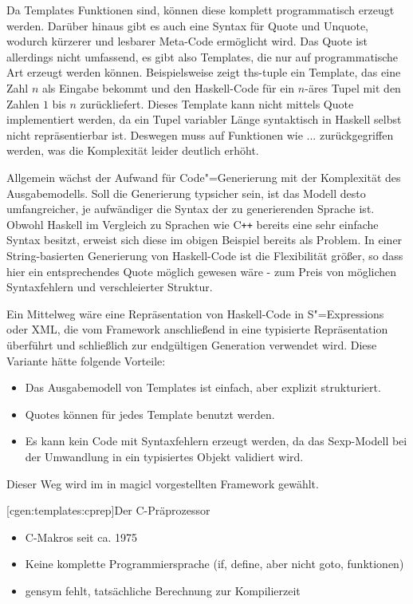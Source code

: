 \documentclass[a4paper, bibgerm]{book}
\newcommand\lsubsection{}
\newcommand\cref{}
\newcommand\abb{}
\newcommand{\sexps}{S"=Expressions}
\newcommand{\cgen}{Code"=Generierung}
\newcommand{\cpp}{C\texttt{++}}
\begin{document}
Da Templates Funktionen sind, können diese komplett programmatisch
erzeugt werden. Darüber hinaus gibt es auch eine Syntax für Quote und
Unquote, wodurch kürzerer und lesbarer Meta-Code ermöglicht wird. Das
Quote ist allerdings nicht umfassend, es gibt also Templates, die nur
auf programmatische Art erzeugt werden können. Beispielsweise zeigt
\abb{ths-tuple} ein Template, das eine Zahl $n$ als Eingabe bekommt und
den Haskell-Code für ein $n$-äres Tupel mit den Zahlen $1$ bis $n$
zurückliefert. Dieses Template kann nicht mittels Quote implementiert
werden, da ein Tupel variabler Länge syntaktisch in Haskell selbst nicht
repräsentierbar ist. Deswegen muss auf Funktionen wie
... zurückgegriffen werden, was die Komplexität leider deutlich
erhöht.

Allgemein wächst der Aufwand für \cgen{} mit der Komplexität des
Ausgabemodells. Soll die Generierung typsicher sein, ist das Modell
desto umfangreicher, je aufwändiger die Syntax der zu generierenden
Sprache ist. Obwohl Haskell im Vergleich zu Sprachen wie \cpp{} bereits
eine sehr einfache Syntax besitzt, erweist sich diese im obigen Beispiel
bereits als Problem. In einer String-basierten Generierung von
Haskell-Code ist die Flexibilität größer, so dass hier ein
entsprechendes Quote möglich gewesen wäre - zum Preis von möglichen
Syntaxfehlern und verschleierter Struktur.

Ein Mittelweg wäre eine Repräsentation von Haskell-Code in \sexps{} oder
XML, die vom Framework anschließend in eine typisierte Repräsentation
überführt und schließlich zur endgültigen Generation verwendet
wird. Diese Variante hätte folgende Vorteile:
\begin{itemize}
\item Das Ausgabemodell von Templates ist einfach, aber explizit
  strukturiert.
\item Quotes können für jedes Template benutzt werden.
\item Es kann kein Code mit Syntaxfehlern erzeugt werden, da das
  Sexp-Modell bei der Umwandlung in ein typisiertes Objekt validiert wird.
\end{itemize}
Dieser Weg wird im in \cref{magicl} vorgestellten Framework gewählt.

\lsubsection[cgen:templates:cprep]{Der C-Präprozessor}
\begin{itemize}
\item C-Makros seit ca. 1975
\item Keine komplette Programmiersprache (if, define, aber nicht goto, funktionen)
\item gensym fehlt, tatsächliche Berechnung zur Kompilierzeit
\end{itemize}
\end{document}
